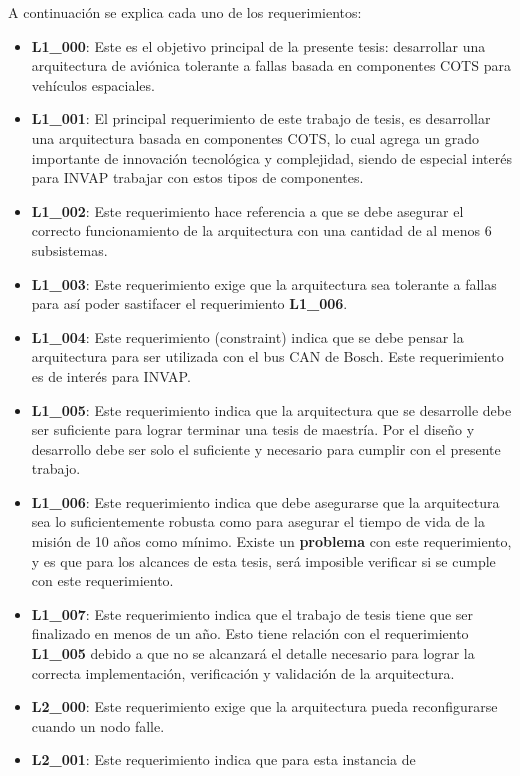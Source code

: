A continuación se explica cada uno de los requerimientos:
\begin{itemize}
\item\textbf{L1\_000}: Este es el objetivo principal de la presente tesis:
  desarrollar una arquitectura de aviónica tolerante a fallas basada en
  componentes COTS para vehículos espaciales.
\item\textbf{L1\_001}: El principal requerimiento de este trabajo de tesis,
  es desarrollar una arquitectura basada en componentes COTS, lo cual agrega un
  grado importante de innovación tecnológica y complejidad, siendo de especial
  interés para INVAP trabajar con estos tipos de componentes.
\item\textbf{L1\_002}: Este requerimiento hace referencia a que se debe asegurar
  el correcto funcionamiento de la arquitectura con una cantidad de al menos
  6 subsistemas.
\item\textbf{L1\_003}: Este requerimiento exige que la arquitectura sea
  tolerante a fallas para así poder sastifacer el requerimiento \textbf{L1\_006}.
\item\textbf{L1\_004}: Este requerimiento (constraint) indica que se debe pensar
  la arquitectura para ser utilizada con el bus CAN de Bosch. Este requerimiento
  es de interés para INVAP.
\item\textbf{L1\_005}: Este requerimiento indica que la arquitectura que se
  desarrolle debe ser suficiente para lograr terminar una tesis de maestría. Por
  el diseño y desarrollo debe ser solo el suficiente y necesario para cumplir
  con el presente trabajo.
\item\textbf{L1\_006}: Este requerimiento indica que debe asegurarse que la
  arquitectura sea lo suficientemente robusta como para asegurar el tiempo de
  vida de la misión de 10 años como mínimo. Existe un \textbf{problema} con este
  requerimiento, y es que para los alcances de esta tesis, será imposible
  verificar si se cumple con este requerimiento.
\item\textbf{L1\_007}: Este requerimiento indica que el trabajo de tesis tiene
  que ser finalizado en menos de un año. Esto tiene relación con el
  requerimiento \textbf{L1\_005} debido a que no se alcanzará el detalle
  necesario para lograr la correcta implementación, verificación y validación de
  la arquitectura.
\item\textbf{L2\_000}: Este requerimiento exige que la arquitectura pueda
  reconfigurarse cuando un nodo falle.
\item\textbf{L2\_001}: Este requerimiento indica que para esta instancia de

\end{itemize}
